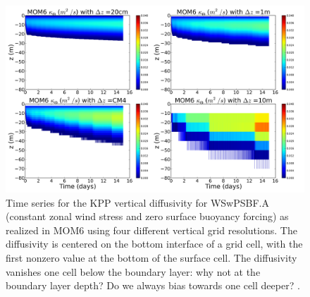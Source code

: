 \begin{figure}[h!t]
\begin{center}
\includegraphics[angle=0,width=14cm]{./figs/MOM6/WSwPSBF_A_MOM6_KPP_diffusivity.png}
\caption[KPP diffusivity from MOM6 for WSwPSBF.A ]{\sf Time series for
  the KPP vertical diffusivity for WSwPSBF.A (constant zonal wind
  stress and zero surface buoyancy forcing) as realized in MOM6 using
  four different vertical grid resolutions.  The diffusivity is
  centered on the bottom interface of a grid cell, with the first
  nonzero value at the bottom of the surface cell.  The diffusivity
  vanishes one cell below the boundary layer: \color{red} why not at
  the boundary layer depth?  Do we always bias towards one cell
  deeper? \color{black}.}
\label{fig:WSwPSBF_A_MOM6_KPP_diffusivity}
\end{center}
\end{figure}


